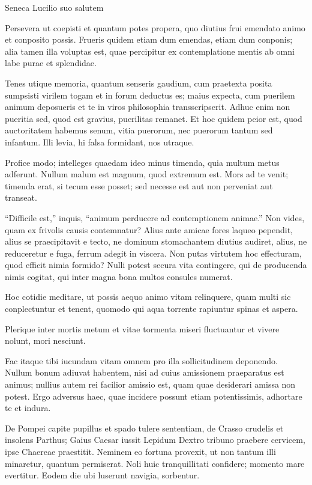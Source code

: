 {\large
\noindent Seneca Lucilio suo salutem

\medskip


\noindent Persevera ut coepisti et quantum potes propera, quo diutius frui emendato animo et conposito possis. Frueris quidem etiam dum emendas, etiam dum  conponis; alia tamen illa voluptas est, quae percipitur ex contemplatione mentis ab omni labe purae et splendidae.

Tenes utique memoria, quantum senseris gaudium, cum praetexta posita sumpsisti virilem togam et in forum deductus es; maius expecta, cum puerilem animum deposueris et te in viros philosophia transscripserit. Adhuc enim non pueritia sed, quod est gravius, puerilitas remanet. Et hoc quidem peior est, quod auctoritatem habemus senum, vitia puerorum, nec puerorum tantum sed infantum. Illi levia, hi falsa formidant, nos utraque.

Profice modo; intelleges quaedam ideo minus timenda, quia multum metus adferunt. Nullum malum est magnum, quod extremum est. Mors ad te venit; timenda erat, si tecum esse posset; sed necesse est aut non perveniat aut transeat.

``Difficile est,'' inquis, ``animum perducere ad contemptionem animae.'' Non vides, quam ex frivolis causis contemnatur? Alius ante amicae fores laqueo pependit, alius se praecipitavit e tecto, ne dominum stomachantem diutius audiret, alius, ne reduceretur e fuga, ferrum adegit in viscera. Non putas virtutem hoc effecturam, quod efficit nimia formido? Nulli potest secura vita contingere, qui de producenda nimis cogitat, qui inter magna bona multos consules numerat.

Hoc cotidie meditare, ut possis aequo animo vitam relinquere, quam multi sic conplectuntur et tenent, quomodo qui aqua torrente rapiuntur spinas et aspera.

Plerique inter mortis metum et vitae tormenta miseri fluctuantur et vivere nolunt, mori nesciunt.

Fac itaque tibi iucundam vitam omnem pro illa sollicitudinem deponendo. Nullum bonum adiuvat habentem, nisi ad cuius amissionem praeparatus est animus; nullius autem rei facilior amissio est, quam quae desiderari amissa non potest. Ergo adversus haec, quae incidere possunt etiam potentissimis, adhortare te et indura.

De Pompei capite pupillus et spado tulere sententiam, de Crasso crudelis et insolens Parthus; Gaius Caesar iussit Lepidum Dextro tribuno praebere cervicem, ipse Chaereae praestitit. Neminem eo fortuna provexit, ut non tantum illi minaretur, quantum permiserat. Noli huic tranquillitati confidere; momento mare evertitur. Eodem die ubi luserunt navigia, sorbentur.

}
